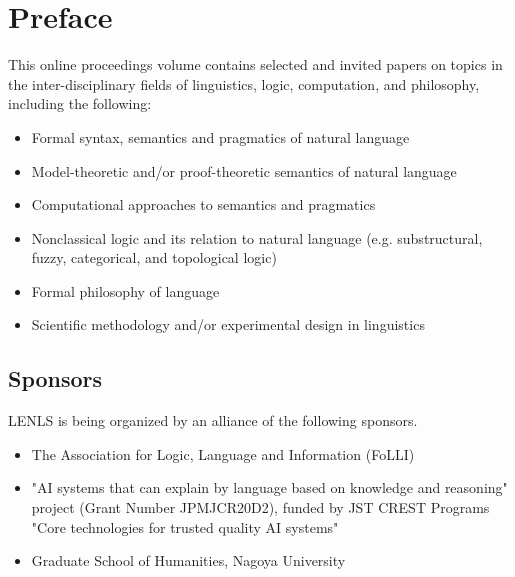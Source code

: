 \documentclass[12pt]{ltjarticle}
\begin{document}
\newpage

\vspace*{20cm}
\vfill
\begin{large}

\end{large}

\newpage
\pagestyle{plain}

\newpage
\section*{Preface}
This online proceedings volume contains selected and invited papers on topics in the inter-disciplinary fields of linguistics, logic, computation, and philosophy, including the following:
\begin{itemize}
\item[$\maltese$] Formal syntax, semantics and pragmatics of natural language
\item[$\maltese$] Model-theoretic and/or proof-theoretic semantics of natural language
\item[$\maltese$] Computational approaches to semantics and pragmatics
\item[$\maltese$] Nonclassical logic and its relation to natural language 
  (e.g. substructural, fuzzy, categorical, and topological logic)
\item[$\maltese$] Formal philosophy of language
\item[$\maltese$] Scientific methodology and/or experimental design in linguistics
\end{itemize}

\subsection*{Sponsors}
LENLS is being organized by an alliance of the following sponsors.
\begin{itemize}
\item The Association for Logic, Language and Information (FoLLI)
\item "AI systems that can explain by language based on knowledge and reasoning" project (Grant Number JPMJCR20D2), funded by JST CREST Programs "Core technologies for trusted quality AI systems"
\item Graduate School of Humanities, Nagoya University
\end{itemize}
\end{document}
